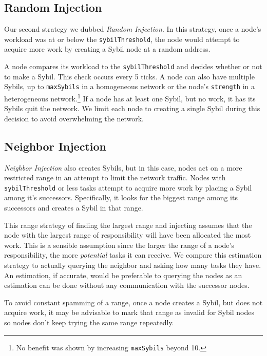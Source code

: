 \documentclass[11pt,letterpaper]{article}
\begin{document}
\subsection{Random Injection}
\label{sec:strat-randomInject}
Our second strategy we dubbed \textit{Random Injection}.
In this strategy, once a node's workload was at or below the \texttt{sybilThreshold}, the node would attempt to acquire more work by creating a Sybil node at a random address.

A node compares its workload to the \texttt{sybilThreshold} and decides whether or not to make a Sybil.
This check occurs every 5 ticks.
A node can also have multiple Sybils, up to \texttt{maxSybils} in a homogeneous network or the node's \texttt{strength} in a heterogeneous network.\footnote{No benefit was shown by increasing \texttt{maxSybils} beyond 10.}
If a node has at least one Sybil, but no work, it has its Sybils quit the network.
We limit each node to creating a single Sybil during this decision to avoid overwhelming the network.




\subsection{Neighbor Injection}
\label{sec:strat-neighbor}
\textit{Neighbor Injection} also creates Sybils, but in this case, nodes act on a more restricted range in an attempt to limit the network traffic.
Nodes with \texttt{sybilThreshold} or less tasks attempt to acquire more work by placing a Sybil among it's successors.
Specifically, it looks for the biggest range among its successors and creates a Sybil in that range.

This range strategy of finding the largest range and injecting assumes that the node with the largest range of responsibility will have been allocated the most work.
This is a sensible assumption since the larger the range of a node's responsibility, the more \textit{potential} tasks it can receive. 
We compare this estimation strategy to actually querying the neighbor and asking how many tasks they have.
An estimation, if accurate, would be preferable to querying the nodes as an estimation can be done without any communication with the successor nodes.

To avoid constant spamming of a range, once a node creates a Sybil, but does not acquire work, it may be advisable to mark that range as invalid for Sybil nodes so nodes don't keep trying the same range repeatedly. 
\end{document}
